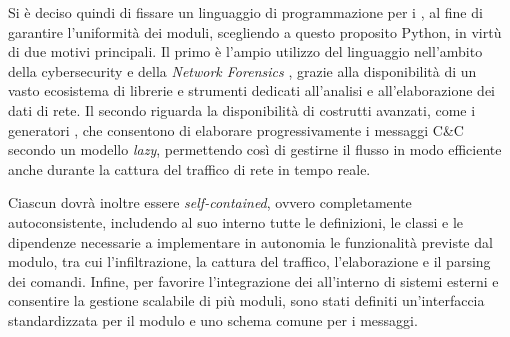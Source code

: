 Si è deciso quindi di fissare un linguaggio di programmazione per i \capture{}, al fine di garantire l'uniformità dei moduli, scegliendo a questo proposito Python, in virtù di due motivi principali. Il primo è l'ampio utilizzo del linguaggio nell'ambito della cybersecurity e della \emph{Network Forensics} \cite{oconnor2012python}, grazie alla disponibilità di un vasto ecosistema di librerie e strumenti dedicati all'analisi e all'elaborazione dei dati di rete. Il secondo riguarda la disponibilità di costrutti avanzati, come i generatori \cite{ramalho2022yield}, che consentono di elaborare progressivamente i messaggi C\&C secondo un modello \emph{lazy}, permettendo così di gestirne il flusso in modo efficiente anche durante la cattura del traffico di rete in tempo reale.




Ciascun \capture{} dovrà inoltre essere \emph{self-contained}, ovvero completamente autoconsistente, includendo al suo interno tutte le definizioni, le classi e le dipendenze necessarie a implementare in autonomia le funzionalità previste dal modulo, tra cui l'infiltrazione, la cattura del traffico, l'elaborazione e il parsing dei comandi. Infine, per favorire l'integrazione dei \capture{} all'interno di sistemi esterni e consentire la gestione scalabile di più moduli, sono stati definiti un'interfaccia standardizzata per il modulo e uno schema comune per i messaggi.

